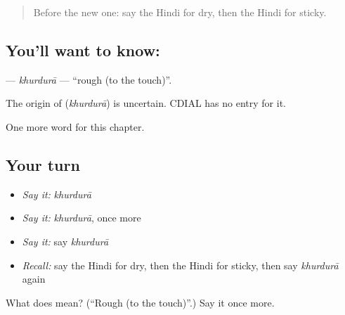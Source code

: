 \label{lesson:HI-C238-khurdura}



\begin{quote}
Before the new one: say the Hindi for dry, then the Hindi for sticky.
\end{quote}

\subsection*{You'll want to know: }
\textbf{} — \emph{khurdurā} — \textquotedblleft{}rough (to the touch)\textquotedblright{}.

\begin{cousinweb}
The origin of \textbf{} (\emph{khurdurā}) is uncertain. CDIAL has no entry for it.
\end{cousinweb}

\begin{grammarlens}[title={What you've built}]
One more word for this chapter.
\end{grammarlens}

\subsection*{Your turn}
\begin{itemize}
\raggedright
  \item \emph{Say it:} \emph{khurdurā}
  \item \emph{Say it:} \emph{khurdurā}, once more
  \item \emph{Say it:} say \emph{khurdurā}
  \item \emph{Recall:} say the Hindi for dry, then the Hindi for sticky, then say \emph{khurdurā} again
\end{itemize}

\begin{tcolorbox}[breakable,colback=teal!4,colframe=teal!35!black,title={Before you move on}]
What does  mean? (\textquotedblleft{}Rough (to the touch)\textquotedblright{}.) Say it once more.
\end{tcolorbox}
